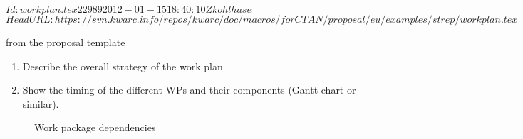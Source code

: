 \svnInfo $Id: workplan.tex 22989 2012-01-15 18:40:10Z kohlhase $
\svnKeyword $HeadURL: https://svn.kwarc.info/repos/kwarc/doc/macros/forCTAN/proposal/eu/examples/strep/workplan.tex $

\begin{todo}{from the proposal template}
\begin{enumerate}
\item Describe the overall strategy of the work plan
\item Show the timing of the different WPs and their components (Gantt chart or similar).
\end{enumerate}
\end{todo}
\begin{figure}
  \caption{Work package dependencies}
  \label{fig:wp-deps}
\end{figure}

\ganttchart[draft,xscale=.45] 


